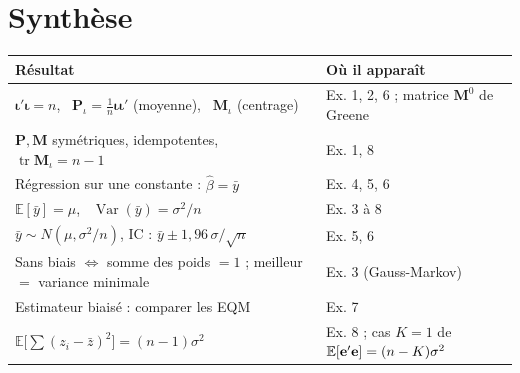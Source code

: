 \documentclass[11pt,a4paper]{article}
\newcommand{\vi}{\bm{\iota}}
\newcommand{\Pm}{\mathbf{P}}\newcommand{\Mm}{\mathbf{M}}
\newcommand{\E}{\mathbb{E}}\newcommand{\Var}{\operatorname{Var}}\newcommand{\Cov}{\operatorname{Cov}}
\newcommand{\tr}{\operatorname{tr}}\newcommand{\EQM}{\operatorname{EQM}}
\begin{document}
\section{Synthèse}

\begin{center}
\renewcommand{\arraystretch}{1.3}
\begin{tabular}{@{}p{6.2cm}p{8.6cm}@{}}
\toprule
Résultat & Où il apparaît \\
\midrule
$\vi'\vi=n$, \ $\Pm_\iota=\frac1n\vi\vi'$ (moyenne), \ $\Mm_\iota$ (centrage) & Ex. 1, 2, 6 ; matrice $\Mm^0$ de Greene \\
$\Pm,\Mm$ symétriques, idempotentes, $\tr\Mm_\iota=n-1$ & Ex. 1, 8 \\
Régression sur une constante : $\hat\beta=\bar y$ & Ex. 4, 5, 6 \\
$\E[\bar y]=\mu$, \ $\Var(\bar y)=\sigma^2/n$ & Ex. 3 à 8 \\
$\bar y\sim N(\mu,\sigma^2/n)$, IC : $\bar y\pm1{,}96\,\sigma/\sqrt n$ & Ex. 5, 6 \\
Sans biais $\iff$ somme des poids $=1$ ; meilleur $=$ variance minimale & Ex. 3 (Gauss-Markov) \\
Estimateur biaisé : comparer les EQM & Ex. 7 \\
$\E\big[\sum(z_i-\bar z)^2\big]=(n-1)\sigma^2$ & Ex. 8 ; cas $K=1$ de $\E[\ve'\ve]=(n-K)\sigma^2$ \\
\bottomrule
\end{tabular}
\end{center}
\end{document}

